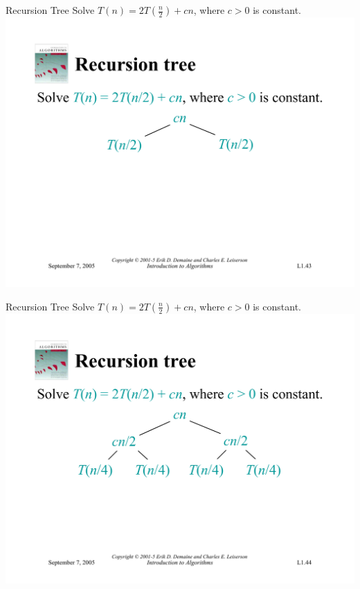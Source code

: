 \documentclass{beamer}
\begin{document}
\begin{frame}{Recursion Tree}
    Solve $T(n) = 2T(\frac{n}{2}) + cn$, where $c > 0$ is constant.\\
    \vspace{5mm}
    \centering
    \includegraphics[width=\textwidth, trim={0.49cm 1.25cm 0.7cm 5.75cm}, clip]{pages/lec1_43}
\end{frame}
\begin{frame}{Recursion Tree}
    Solve $T(n) = 2T(\frac{n}{2}) + cn$, where $c > 0$ is constant.\\
    \vspace{5mm}
    \centering
    \includegraphics[width=\textwidth, trim={0.49cm 1.25cm 0.7cm 5.75cm}, clip]{pages/lec1_44}
\end{frame}
\end{document}
